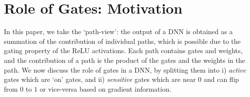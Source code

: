 \section{ Role of Gates: Motivation }
In this paper, we take the `path-view': the output of a DNN is obtained as a summation of the contribution of individual paths, which is possible due to the gating property of the ReLU activations. Each path contains gates and weights, and the contribution of a path is the product of the gates and the weights in the path. We now discuss the role of gates in a DNN, by splitting them into i) \emph{active} gates which are `on' gates, and ii) \emph{sensitive} gates which are near $0$ and can flip from $0$ to $1$ or vice-versa based on gradient information.
\FloatBarrier
\begin{figure}[h]
\centering
\end{figure}
